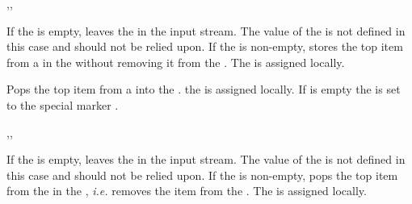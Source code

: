 \documentclass[oneside]{book}
\begin{document}
\begin{function}{\seqGetT,\seqGetF,\seqGetTF}
\begin{syntax}
   
   
    
\end{syntax}
If the  is empty, leaves the  in the
input stream.  The value of the  is
not defined in this case and should not be relied upon.  If the
 is non-empty, stores the top item from a
 in the  without removing it from
the . The  is assigned locally.
\begin{demohigh}
\seqSetFromClist {}
\seqGetTF \lTmpaSeq {} {}
\end{demohigh}
\end{function}

\begin{function}{\seqPop}
\begin{syntax}
  
\end{syntax}
Pops the top item from a  into the
. the  is assigned locally.
If  is empty the  is set to
the special marker .
\begin{demohigh}
\seqSetFromClist {}
\seqPop \lTmpaSeq \lTmpaTl
\seqVarJoin \lTmpaSeq {,}
\end{demohigh}
\end{function}

\begin{function}{\seqPopT,\seqPopF,\seqPopTF}
\begin{syntax}
   
   
    
\end{syntax}
If the  is empty, leaves the  in the
input stream.  The value of the  is
not defined in this case and should not be relied upon.  If the
 is non-empty, pops the top item from the 
in the , \emph{i.e.} removes the item from the
. The  is assigned locally.
\begin{demohigh}
\seqPopTF \cEmptySeq {} {}
\end{demohigh}
\end{function}
\end{document}
